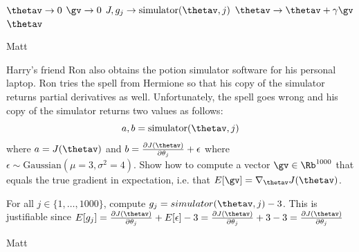 \begin{questions}
    \begin{tcolorbox}[fit,height=1cm, width=15cm, blank, borderline={1pt}{-2pt}]
    \end{tcolorbox}
    \begin{soln}
    \begin{algorithmic}[1]
    \State $\thetav \rightarrow 0$  
        \State $\gv \rightarrow 0$ 
         
            \State $J, g_j \rightarrow \text{simulator}(\thetav, j)$ 
        \EndFor
        \State $\thetav \rightarrow \thetav + \gamma \gv$ 
         
            \State {}
        \EndIf
    \EndWhile
    \Return $\thetav$ 
    \EndProcedure
    \end{algorithmic}
    \end{soln}
    \begin{qauthor}
    Matt
    \end{qauthor}
    
\question[4] Harry's friend Ron also obtains the potion simulator software for his personal laptop. Ron tries the spell from Hermione so that his copy of the simulator returns partial derivatives as well. Unfortunately, the spell goes wrong and his copy of the simulator returns two values as follows:
$$a, b = \text{simulator}(\thetav, j)$$
where $a = J(\thetav)$ and $b = \frac{\partial J(\thetav)}{\partial \theta_j} + \epsilon$ where $\epsilon \sim \text{Gaussian}(\mu = 3, \sigma^2 = 4)$. Show how to compute a vector $\gv \in \Rb^{1000}$ that equals the true gradient in expectation, i.e. that $E[\gv] = \nabla_{\thetav} J(\thetav)$.
    \begin{tcolorbox}[fit,height=1cm, width=15cm, blank, borderline={1pt}{-2pt}]
    \end{tcolorbox}
    \begin{soln}
    For all $j \in \{1, \ldots, 1000\}$, compute $g_j = simulator(\thetav, j) - 3$.
    This is justifiable since $E[g_j] = \frac{\partial J(\thetav)}{\partial \theta_j} + E[\epsilon] - 3 = \frac{\partial J(\thetav)}{\partial \theta_j} + 3 - 3 = \frac{\partial J(\thetav)}{\partial \theta_j}$
    \end{soln}
    \begin{qauthor}
    Matt
    \end{qauthor}


\end{questions}


